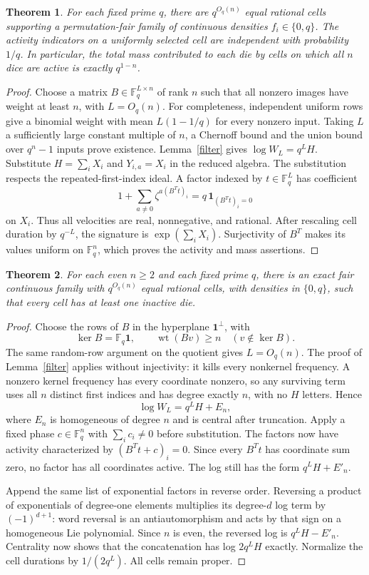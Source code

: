 \documentclass[11pt]{article}
\newtheorem{theorem}{Theorem}
\newcommand{\wt}{\operatorname{wt}}
\begin{document}
\begin{theorem}\label{qpath}
For each fixed prime $q$, there are $q^{O_q(n)}$ equal rational cells
supporting a permutation-fair family of continuous densities
$f_i\in\{0,q\}$. The activity indicators on a uniformly selected cell
are independent with probability $1/q$. In particular, the total mass
contributed to each die by cells on which all $n$ dice are active is
exactly $q^{1-n}$.
\end{theorem}
\begin{proof}
Choose a matrix $B\in\mathbb F_q^{L\times n}$ of rank $n$ such that
all nonzero images have weight at least $n$, with $L=O_q(n)$.
For completeness, independent uniform rows give a binomial weight with
mean $L(1-1/q)$ for every nonzero input. Taking $L$ a sufficiently large
constant multiple of $n$, a Chernoff bound and the union bound over
$q^n-1$ inputs prove existence.
Lemma~\ref{filter} gives $\log W_L=q^L H$. Substitute
$H=\sum_iX_i$ and $Y_{i,a}=X_i$ in the reduced algebra. The substitution
respects the repeated-first-index ideal. A factor indexed by
$t\in\mathbb F_q^L$ has coefficient
\[
 1+\sum_{a\ne0}\zeta^{a(B^Tt)_i}
 =q\,\boldsymbol1_{(B^Tt)_i=0}
\]
on $X_i$. Thus all velocities are real, nonnegative, and rational.
After rescaling cell duration by $q^{-L}$, the signature is
$\exp(\sum_iX_i)$. Surjectivity of $B^T$ makes its values uniform on
$\mathbb F_q^n$, which proves the activity and mass assertions.
\end{proof}

\begin{theorem}\label{proper}
For each even $n\ge2$ and each fixed prime $q$, there is an exact fair
continuous family with $q^{O_q(n)}$ equal rational cells, with densities
in $\{0,q\}$, such that every cell has at least one inactive die.
\end{theorem}
\begin{proof}
Choose the rows of $B$ in the hyperplane $\boldsymbol1^\perp$, with
\[
 \ker B=\mathbb F_q\boldsymbol1,
 \qquad \wt(Bv)\ge n\quad(v\notin\ker B).
\]
The same random-row argument on the quotient gives $L=O_q(n)$.
The proof of Lemma~\ref{filter} applies without injectivity: it kills
every nonkernel frequency. A nonzero kernel frequency has every
coordinate nonzero, so any surviving term uses all $n$ distinct first
indices and has degree exactly $n$, with no $H$ letters. Hence
\[
 \log W_L=q^L H+E_n,
\]
where $E_n$ is homogeneous of degree $n$ and is central after truncation.
Apply a fixed phase $c\in\mathbb F_q^n$ with $\sum_i c_i\ne0$ before
substitution. The factors now have activity characterized by
$(B^Tt+c)_i=0$. Since every $B^Tt$ has coordinate sum zero, no factor
has all coordinates active. The log still has the form $q^LH+E'_n$.

Append the same list of exponential factors in reverse order.
Reversing a product of exponentials of degree-one elements multiplies
its degree-$d$ log term by $(-1)^{d+1}$: word reversal is an
antiautomorphism and acts by that sign on a homogeneous Lie polynomial.
Since $n$ is even, the reversed log is $q^LH-E'_n$. Centrality now
shows that the concatenation has log $2q^LH$ exactly. Normalize the
cell durations by $1/(2q^L)$. All cells remain proper.
\end{proof}
\end{document}
